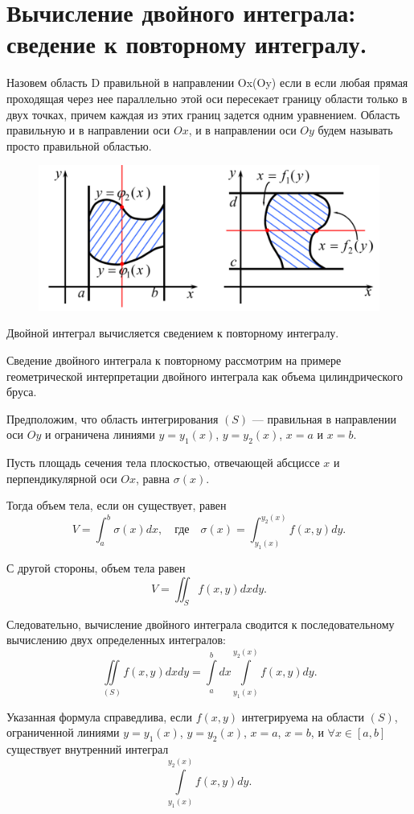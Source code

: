\documentclass{article}
\begin{document}
\section{Вычисление двойного интеграла: сведение к повторному интегралу.}
Назовем область D правильной в направлении Ox(Oy) если в если любая прямая проходящая через нее параллельно этой оси пересекает границу области только в двух  точках, причем каждая из этих границ задется одним уравнением. Область правильную и в направлении оси $Ox$, и в направлении оси $Oy$ будем называть просто правильной областью.
\begin{figure}[H]
  \includegraphics[width=\textwidth]{includes/right}
\end{figure}

Двойной интеграл вычисляется сведением к повторному интегралу.

Сведение двойного интеграла к повторному рассмотрим на примере геометрической интерпретации двойного интеграла как объема цилиндрического бруса.

Предположим, что область интегрирования $(S)$ --- правильная в направлении оси $Oy$ и ограничена линиями $y = y_1(x)$, $y = y_2(x)$, $x = a$ и $x = b$.

Пусть площадь сечения тела плоскостью, отвечающей абсциссе $x$ и перпендикулярной оси $Ox$, равна $\sigma(x)$.

Тогда объем тела, если он существует, равен
\[
  V = \int_a^b \sigma(x) dx, \quad \text{где} \quad \sigma(x) = \int_{y_1(x)}^{y_2(x)} f(x, y) dy.
\]

С другой стороны, объем тела равен
\[
  V = \iint_S f(x, y) dxdy.
\]

Следовательно, вычисление двойного интеграла сводится к последовательному вычислению двух определенных интегралов:
\[
  \iint\limits_{(S)} f(x,y) dxdy = \int\limits_{a}^{b} dx \int\limits_{y_1(x)}^{y_2(x)} f(x,y) dy.
\]

Указанная формула справедлива, если $f(x, y)$ интегрируема на области $(S)$, ограниченной линиями $y = y_1(x)$, $y = y_2(x)$, $x = a$, $x = b$, и $\forall x \in [a, b]$ существует внутренний интеграл
\[
  \int\limits_{y_1(x)}^{y_2(x)} f(x,y) dy.
\]
\end{document}
